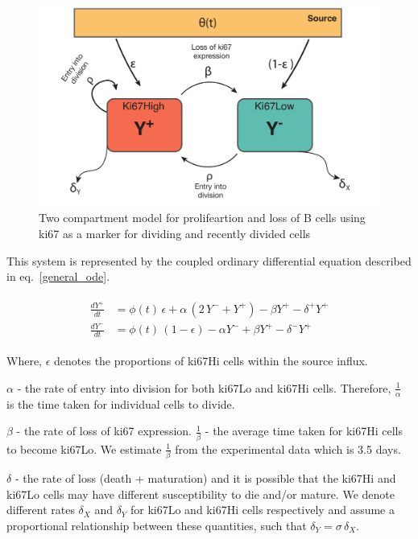\documentclass[11pt]{article}
\begin{document}
\begin{figure}[htbp]
	\centerline{\includegraphics[scale = 0.5] {TwoComp_ki67.pdf}}
	\caption{Two compartment model for prolifeartion and loss of B cells using ki67 as a marker for dividing and recently divided cells \label{fig1}}
\end{figure}

This system is represented by the coupled ordinary differential equation described in eq.~\ref{general_ode}.

\begin{eqnarray}
\begin{aligned}
\frac{dY^+}{dt} &= \phi(t) \, \epsilon + \alpha \, (2\, Y^- + Y^+) - \beta Y^+ - \delta^+ Y^+ \\
\frac{dY^-}{dt} &= \phi(t) \, (1-\epsilon) - \alpha Y^-  + \beta Y^+ - \delta^- Y^+
\end{aligned}
\label{general_ode}
\end{eqnarray}

Where, $\epsilon$ denotes the proportions of ki67Hi cells within the source influx.

$\alpha$ - the rate of entry into division for both ki67Lo and ki67Hi cells.
Therefore, $\frac{1}{\alpha}$ is the time taken for individual cells to divide.

$\beta$ - the rate of loss of ki67 expression.
$\frac{1}{\beta}$ - the average time taken for ki67Hi cells to become ki67Lo.
We estimate $\frac{1}{\beta}$ from the experimental data which is 3.5 days. 

$\delta$ - the rate of loss (death + maturation) and it is possible that the ki67Hi and ki67Lo cells may have different susceptibility to die and/or mature.
We denote different rates $\delta_X$ and $\delta_Y$ for ki67Lo and ki67Hi cells respectively and assume a proportional relationship between these quantities, such that $\delta_Y = \sigma \, \delta_X$.
\end{document}
